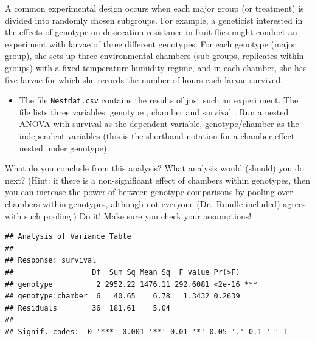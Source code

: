\documentclass[
  12pt,
]{book}
\newenvironment{Shaded}{\begin{snugshade}}{\end{snugshade}}
\newcommand{\DataTypeTok}[1]{\textcolor[rgb]{0.13,0.29,0.53}{#1}}
\newcommand{\KeywordTok}[1]{\textcolor[rgb]{0.13,0.29,0.53}{\textbf{#1}}}
\newcommand{\NormalTok}[1]{#1}
\newcommand{\OperatorTok}[1]{\textcolor[rgb]{0.81,0.36,0.00}{\textbf{#1}}}
\newcommand{\StringTok}[1]{\textcolor[rgb]{0.31,0.60,0.02}{#1}}
\providecommand{\tightlist}{%
  \setlength{\itemsep}{0pt}\setlength{\parskip}{0pt}}
\begin{document}
A common experimental design occurs when each major group (or treatment) is divided into randomly chosen subgroups. For example, a geneticist interested in the effects of genotype on desiccation resistance in fruit flies might conduct an experiment with larvae of three different genotypes. For each genotype (major group), she sets up three environmental chambers (sub-groups, replicates within groups) with a fixed temperature humidity regime, and in each chamber, she has five larvae for which she records the number of hours each larvae survived.

\begin{itemize}
\tightlist
\item
  The file \texttt{Nestdat.csv} contains the results of just such an experi ment. The file lists three variables: genotype , chamber and survival . Run a nested ANOVA with survival as the dependent variable, genotype/chamber as the independent variables (this is the shorthand notation for a chamber effect nested under genotype).
\end{itemize}

\begin{Shaded}
\end{Shaded}

What do you conclude from this analysis? What analysis would (should) you do next? (Hint: if there is a non-significant effect of chambers within genotypes, then you can increase the power of between-genotype comparisons by pooling over chambers within genotypes, although not everyone (Dr.~Rundle included) agrees with such pooling.) Do it! Make sure you check your assumptions!

\begin{verbatim}
## Analysis of Variance Table
## 
## Response: survival
##                  Df  Sum Sq Mean Sq  F value Pr(>F)    
## genotype          2 2952.22 1476.11 292.6081 <2e-16 ***
## genotype:chamber  6   40.65    6.78   1.3432 0.2639    
## Residuals        36  181.61    5.04                    
## ---
## Signif. codes:  0 '***' 0.001 '**' 0.01 '*' 0.05 '.' 0.1 ' ' 1
\end{verbatim}
\end{document}
